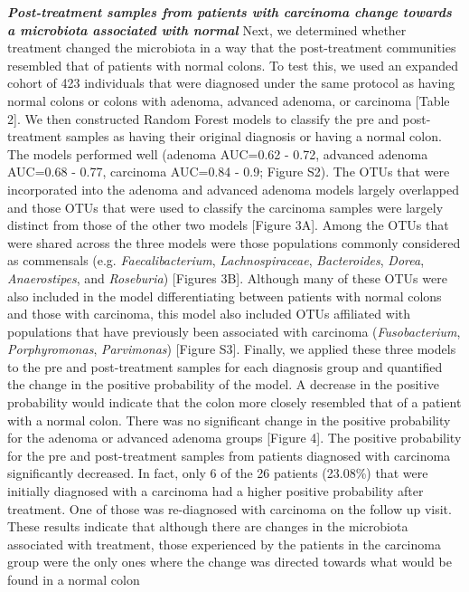 \documentclass[12pt,]{article}
\begin{document}
\textbf{\emph{Post-treatment samples from patients with carcinoma change
towards a microbiota associated with normal}} Next, we determined
whether treatment changed the microbiota in a way that the
post-treatment communities resembled that of patients with normal
colons. To test this, we used an expanded cohort of 423 individuals that
were diagnosed under the same protocol as having normal colons or colons
with adenoma, advanced adenoma, or carcinoma {[}Table 2{]}. We then
constructed Random Forest models to classify the pre and post-treatment
samples as having their original diagnosis or having a normal colon. The
models performed well (adenoma AUC=0.62 - 0.72, advanced adenoma
AUC=0.68 - 0.77, carcinoma AUC=0.84 - 0.9; Figure S2). The OTUs that
were incorporated into the adenoma and advanced adenoma models largely
overlapped and those OTUs that were used to classify the carcinoma
samples were largely distinct from those of the other two models
{[}Figure 3A{]}. Among the OTUs that were shared across the three models
were those populations commonly considered as commensals (e.g.
\emph{Faecalibacterium}, \emph{Lachnospiraceae}, \emph{Bacteroides},
\emph{Dorea}, \emph{Anaerostipes}, and \emph{Roseburia}) {[}Figures
3B{]}. Although many of these OTUs were also included in the model
differentiating between patients with normal colons and those with
carcinoma, this model also included OTUs affiliated with populations
that have previously been associated with carcinoma
(\emph{Fusobacterium}, \emph{Porphyromonas}, \emph{Parvimonas})
{[}Figure S3{]}. Finally, we applied these three models to the pre and
post-treatment samples for each diagnosis group and quantified the
change in the positive probability of the model. A decrease in the
positive probability would indicate that the colon more closely
resembled that of a patient with a normal colon. There was no
significant change in the positive probability for the adenoma or
advanced adenoma groups {[}Figure 4{]}. The positive probability for the
pre and post-treatment samples from patients diagnosed with carcinoma
significantly decreased. In fact, only 6 of the 26 patients (23.08\%)
that were initially diagnosed with a carcinoma had a higher positive
probability after treatment. One of those was re-diagnosed with
carcinoma on the follow up visit. These results indicate that although
there are changes in the microbiota associated with treatment, those
experienced by the patients in the carcinoma group were the only ones
where the change was directed towards what would be found in a normal
colon
\end{document}
